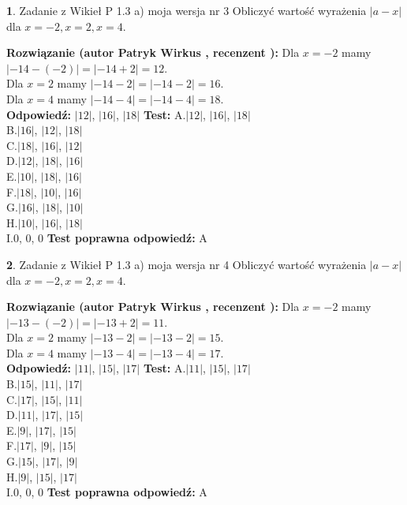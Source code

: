 \documentclass[12pt, a4paper]{article}
\theoremstyle{definition} %
\newtheorem{zad}{}
\newcommand{\zadStart}[1]{\begin{zad}#1\newline}
\newcommand{\zadStop}{\end{zad}}
\newcommand{\rozwStart}[2]{\noindent \textbf{Rozwiązanie (autor #1 , recenzent #2): }\newline}
\newcommand{\rozwStop}{\newline}
\newcommand{\odpStart}{\noindent \textbf{Odpowiedź:}\newline}
\newcommand{\odpStop}{\newline}
\newcommand{\testStart}{\noindent \textbf{Test:}\newline}
\newcommand{\testStop}{\newline}
\newcommand{\kluczStart}{\noindent \textbf{Test poprawna odpowiedź:}\newline}
\newcommand{\kluczStop}{\newline}
\begin{document}
\zadStart{Zadanie z Wikieł P 1.3 a) moja wersja nr 3}
Obliczyć wartość wyrażenia $|a - x|$ dla $x=-2,x=2,x=4$.
\zadStop
\rozwStart{Patryk Wirkus}{}
Dla $x = -2$ mamy $|-14 - (-2)| = |-14 + 2| = 12$.\\
Dla $x = 2$ mamy $|-14 - 2| = |-14 - 2| = 16$.\\
Dla $x = 4$ mamy $|-14 - 4| = |-14 - 4| = 18$.\\
\rozwStop
\odpStart
$|12|$, $|16|$, $|18|$
\odpStop
\testStart
A.$|12|$, $|16|$, $|18|$\\
B.$|16|$, $|12|$, $|18|$\\
C.$|18|$, $|16|$, $|12|$\\
D.$|12|$, $|18|$, $|16|$\\
E.$|10|$, $|18|$, $|16|$\\
F.$|18|$, $|10|$, $|16|$\\
G.$|16|$, $|18|$, $|10|$\\
H.$|10|$, $|16|$, $|18|$\\
I.$0$, $0$, $0$
\testStop
\kluczStart
A
\kluczStop



\zadStart{Zadanie z Wikieł P 1.3 a) moja wersja nr 4}
Obliczyć wartość wyrażenia $|a - x|$ dla $x=-2,x=2,x=4$.
\zadStop
\rozwStart{Patryk Wirkus}{}
Dla $x = -2$ mamy $|-13 - (-2)| = |-13 + 2| = 11$.\\
Dla $x = 2$ mamy $|-13 - 2| = |-13 - 2| = 15$.\\
Dla $x = 4$ mamy $|-13 - 4| = |-13 - 4| = 17$.\\
\rozwStop
\odpStart
$|11|$, $|15|$, $|17|$
\odpStop
\testStart
A.$|11|$, $|15|$, $|17|$\\
B.$|15|$, $|11|$, $|17|$\\
C.$|17|$, $|15|$, $|11|$\\
D.$|11|$, $|17|$, $|15|$\\
E.$|9|$, $|17|$, $|15|$\\
F.$|17|$, $|9|$, $|15|$\\
G.$|15|$, $|17|$, $|9|$\\
H.$|9|$, $|15|$, $|17|$\\
I.$0$, $0$, $0$
\testStop
\kluczStart
A
\kluczStop
\end{document}

